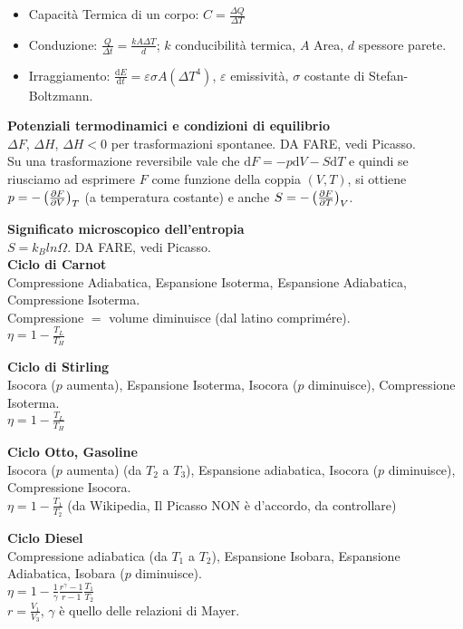 \documentclass[10pt,a4paper]{article}
\newcommand{\de}{{\ensuremath{ \mbox{d}}}}
\newcommand{\dpar}[2]{{\ensuremath{\frac{\partial {#1}}{\partial {#2}}}}}
\begin{document}
\begin{multicols}{2}
  \begin{itemize}
  \item Capacità Termica di un corpo: $C = \frac{\Delta Q}{\Delta T}$
  \item Conduzione: $\frac{Q}{\Delta t} = \frac{k A \Delta T}{d}$; $k$ conducibilit\`a termica, $A$ Area, $d$ spessore parete.
  \item Irraggiamento: $\frac{\de E}{\de t} = \varepsilon \sigma A (\Delta T^4)$, $\varepsilon$ emissivit\`a, $\sigma$ costante di Stefan-Boltzmann.
  \end{itemize}

\textbf{Potenziali termodinamici e condizioni di equilibrio} \\
$\Delta F$, $\Delta H$, $\Delta H < 0$ per trasformazioni spontanee. DA FARE, vedi Picasso. \\

Su una trasformazione reversibile vale che $\de F = - p \de V - S \de T$ e quindi se riusciamo ad esprimere $F$ come funzione della coppia $(V, T)$, si ottiene $p = - \lrt{\dpar{F}{V}}_T$ (a temperatura costante) e anche $S = - \lrt{\dpar{F}{T}}_V$.

\textbf{Significato microscopico dell'entropia} \\
$S=k_B ln \Omega$. DA FARE, vedi Picasso. \\

\textbf{Ciclo di Carnot} \\
Compressione Adiabatica, Espansione Isoterma, Espansione Adiabatica, Compressione Isoterma. \\
Compressione $=$ volume diminuisce (dal latino comprimére). \\
$\eta = 1- \frac{T_L}{T_H}$

\textbf{Ciclo di Stirling} \\
Isocora ($p$ aumenta), Espansione Isoterma, Isocora ($p$ diminuisce), Compressione Isoterma. \\
$\eta = 1- \frac{T_L}{T_H}$

\textbf{Ciclo Otto, Gasoline} \\
Isocora ($p$ aumenta) (da $T_2$ a $T_3$), Espansione adiabatica, Isocora ($p$ diminuisce), Compressione Isocora. \\
$\eta = 1- \frac{T_1}{T_2}$ (da Wikipedia, Il Picasso NON è d'accordo, da controllare)

\textbf{Ciclo Diesel} \\
Compressione adiabatica (da $T_1$ a $T_2$), Espansione Isobara, Espansione Adiabatica, Isobara ($p$ diminuisce). \\
$\eta= 1-\frac{1}{\gamma} \frac{r^\gamma -1}{r-1} \frac{T_1}{T_2}$ \\
$r=\frac{V_1}{V_3}$, $\gamma$ è quello delle relazioni di Mayer.



\end{multicols}
\end{document}
